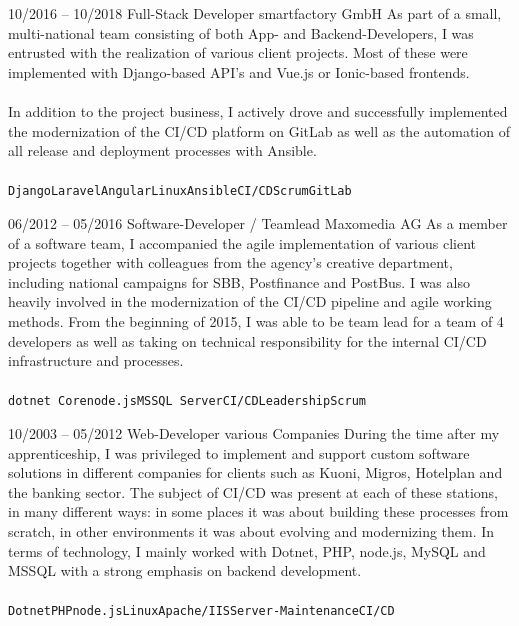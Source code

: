 \documentclass[10pt]{../developercv} %
\begin{document}
\begin{entrylist}
	\entry
	{\footnotesize 10/2016 -- 10/2018}
	{Full-Stack Developer}
	{smartfactory GmbH}
	{As part of a small, multi-national team consisting of both App- and Backend-Developers, I was entrusted with the realization of various client projects. Most of these were implemented with Django-based API's and Vue.js or Ionic-based frontends.\\ \\ In addition to the project business, I actively drove and successfully implemented the modernization of the CI/CD platform on GitLab as well as the automation of all release and deployment processes with Ansible.\\ \\ \small \texttt{Django}\slashsep\texttt{Laravel}\slashsep\texttt{Angular}\slashsep\texttt{Linux}\slashsep\texttt{Ansible}\slashsep\texttt{CI/CD}\slashsep\texttt{Scrum}\slashsep\texttt{GitLab}}

	\entry
	{\footnotesize 06/2012 -- 05/2016}
	{Software-Developer / Teamlead}
	{Maxomedia AG}
	{As a member of a software team, I accompanied the agile implementation of various client projects together with colleagues from the agency's creative department, including national campaigns for SBB, Postfinance and PostBus. I was also heavily involved in the modernization of the CI/CD pipeline and agile working methods. From the beginning of 2015, I was able to be team lead for a team of 4 developers as well as taking on technical responsibility for the internal CI/CD infrastructure and processes.\\ \\ \small \texttt{dotnet Core}\slashsep\texttt{node.js}\slashsep\texttt{MSSQL Server}\slashsep\texttt{CI/CD}\slashsep\texttt{Leadership}\slashsep\texttt{Scrum}}

	\entry
	{\footnotesize 10/2003 -- 05/2012}
	{Web-Developer}
	{various Companies}
	{During the time after my apprenticeship, I was privileged to implement and support custom software solutions in different companies for clients such as Kuoni, Migros, Hotelplan and the banking sector. The subject of CI/CD was present at each of these stations, in many different ways: in some places it was about building these processes from scratch, in other environments it was about evolving and modernizing them. In terms of technology, I mainly worked with Dotnet, PHP, node.js, MySQL and MSSQL with a strong emphasis on backend development.\\ \\ \small \texttt{Dotnet}\slashsep\texttt{PHP}\slashsep\texttt{node.js}\slashsep\texttt{Linux}\slashsep\texttt{Apache/IIS}\slashsep\texttt{Server-Maintenance}\slashsep\texttt{CI/CD}}

\end{entrylist}
\end{document}

